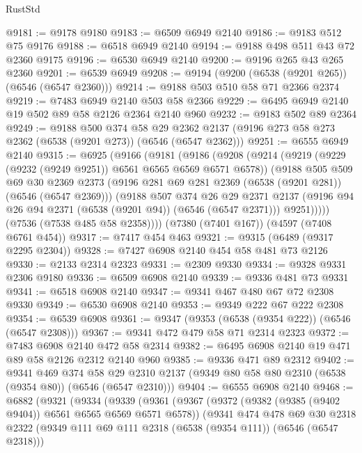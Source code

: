 \begin{lexlean}{RustStd}
\begin{coremodule}
@9181 := @9178 @9180
@9183 := @6509 @6949 @2140
@9186 := @9183 @512 @75 @9176
@9188 := @6518 @6949 @2140
@9194 := @9188 @498 @511 @43 @72 @2360 @9175
@9196 := @6530 @6949 @2140
@9200 := @9196 @265 @43 @265 @2360
@9201 := @6539 @6949
@9208 := @9194 (@9200 (@6538 (@9201 @265)) (@6546 (@6547 @2360)))
@9214 := @9188 @503 @510 @58 @71 @2366 @2374
@9219 := @7483 @6949 @2140 @503 @58 @2366
@9229 := @6495 @6949 @2140 @19 @502 @89 @58 @2126 @2364 @2140 @960
@9232 := @9183 @502 @89 @2364
@9249 := @9188
    @500
    @374
    @58
    @29
    @2362
    @2137
    (@9196 @273 @58 @273 @2362 (@6538 (@9201 @273)) (@6546 (@6547 @2362)))
@9251 := @6555 @6949 @2140
@9315 := @6925
    (@9166
      (@9181
        (@9186
          (@9208
            (@9214
              (@9219 (@9229 (@9232 (@9249 @9251)) @6561 @6565 @6569 @6571 @6578))
              (@9188
                @505
                @509
                @69
                @30
                @2369
                @2373
                (@9196 @281 @69 @281 @2369 (@6538 (@9201 @281)) (@6546 (@6547 @2369)))
                (@9188
                  @507
                  @374
                  @26
                  @29
                  @2371
                  @2137
                  (@9196 @94 @26 @94 @2371 (@6538 (@9201 @94)) (@6546 (@6547 @2371)))
                  @9251)))))
        (@7536 (@7538 @485 @58 @2358))))
    (@7380 (@7401 @167))
    (@4597 (@7408 @6761 @454))
@9317 := @7417 @454 @463
@9321 := @9315 (@6489 (@9317 @2295 @2304))
@9328 := @7427 @6908 @2140 @454 @58 @481 @73 @2126
@9330 := @2133 @2314 @2323
@9331 := @2309 @9330
@9334 := @9328 @9331 @2306 @9180
@9336 := @6509 @6908 @2140
@9339 := @9336 @481 @73 @9331
@9341 := @6518 @6908 @2140
@9347 := @9341 @467 @480 @67 @72 @2308 @9330
@9349 := @6530 @6908 @2140
@9353 := @9349 @222 @67 @222 @2308
@9354 := @6539 @6908
@9361 := @9347 (@9353 (@6538 (@9354 @222)) (@6546 (@6547 @2308)))
@9367 := @9341 @472 @479 @58 @71 @2314 @2323
@9372 := @7483 @6908 @2140 @472 @58 @2314
@9382 := @6495 @6908 @2140 @19 @471 @89 @58 @2126 @2312 @2140 @960
@9385 := @9336 @471 @89 @2312
@9402 := @9341
    @469
    @374
    @58
    @29
    @2310
    @2137
    (@9349 @80 @58 @80 @2310 (@6538 (@9354 @80)) (@6546 (@6547 @2310)))
@9404 := @6555 @6908 @2140
@9468 := @6882
    (@9321
      (@9334
        (@9339
          (@9361
            (@9367
              (@9372 (@9382 (@9385 (@9402 @9404)) @6561 @6565 @6569 @6571 @6578))
              (@9341
                @474
                @478
                @69
                @30
                @2318
                @2322
                (@9349 @111 @69 @111 @2318 (@6538 (@9354 @111)) (@6546 (@6547 @2318)))

\end{coremodule}
\end{lexlean}
